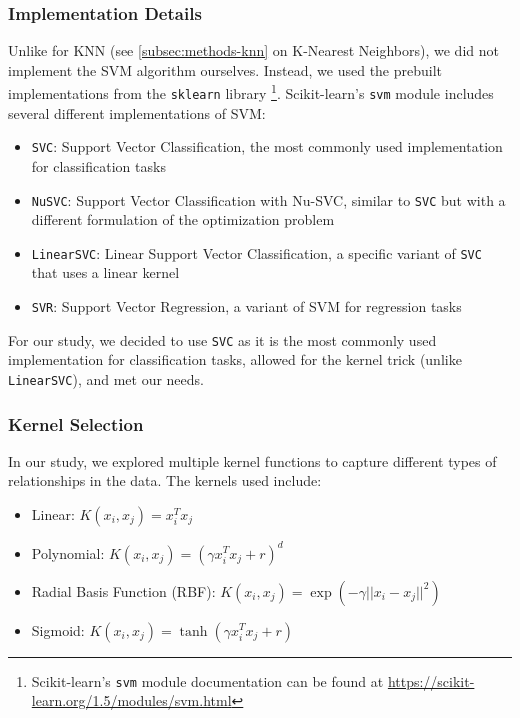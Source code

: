 \subsubsection{Implementation Details}

Unlike for KNN (see \autoref{subsec:methods-knn} on K-Nearest Neighbors), we did not implement the SVM algorithm ourselves.
Instead, we used the prebuilt implementations from the \texttt{sklearn} library
\footnote{Scikit-learn's \texttt{svm} module documentation can be found at \url{https://scikit-learn.org/1.5/modules/svm.html}}.
Scikit-learn's \texttt{svm} module includes several different implementations of SVM:

\begin{itemize}
    \item \texttt{SVC}: Support Vector Classification, the most commonly used implementation for classification tasks
    \item \texttt{NuSVC}: Support Vector Classification with Nu-SVC, similar to \texttt{SVC} but with a different formulation of the optimization problem 
    \item \texttt{LinearSVC}: Linear Support Vector Classification, a specific variant of \texttt{SVC} that uses a linear kernel
    \item \texttt{SVR}: Support Vector Regression, a variant of SVM for regression tasks
\end{itemize}

For our study, we decided to use \texttt{SVC} as it is the most commonly used implementation
for classification tasks, allowed for the kernel trick (unlike \texttt{LinearSVC}), and met our needs.

\subsubsection{Kernel Selection}

In our study, we explored multiple kernel functions to capture different types of relationships in the data. The kernels used include:

\begin{itemize}
    \item Linear: $K(x_i, x_j) = x_i^T x_j$
    \item Polynomial: $K(x_i, x_j) = (\gamma x_i^T x_j + r)^d$
    \item Radial Basis Function (RBF): $K(x_i, x_j) = \exp(-\gamma ||x_i - x_j||^2)$
    \item Sigmoid: $K(x_i, x_j) = \tanh(\gamma x_i^T x_j + r)$
\end{itemize}


